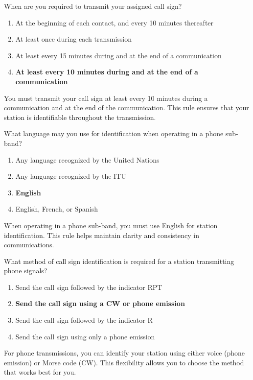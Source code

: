 \begin{tcolorbox}[colback=gray!10!white,colframe=black!75!black,title={T1F03}]
    When are you required to transmit your assigned call sign?
    \begin{enumerate}[label=\Alph*),noitemsep]
        \item At the beginning of each contact, and every 10 minutes thereafter
        \item At least once during each transmission
        \item At least every 15 minutes during and at the end of a communication
        \item \textbf{At least every 10 minutes during and at the end of a communication}
    \end{enumerate}
\end{tcolorbox}
You must transmit your call sign at least every 10 minutes during a communication and at the end of the communication. This rule ensures that your station is identifiable throughout the transmission.

\begin{tcolorbox}[colback=gray!10!white,colframe=black!75!black,title={T1F04}]
    What language may you use for identification when operating in a phone sub-band?
    \begin{enumerate}[label=\Alph*),noitemsep]
        \item Any language recognized by the United Nations
        \item Any language recognized by the ITU
        \item \textbf{English}
        \item English, French, or Spanish
    \end{enumerate}
\end{tcolorbox}
When operating in a phone sub-band, you must use English for station identification. This rule helps maintain clarity and consistency in communications.

\begin{tcolorbox}[colback=gray!10!white,colframe=black!75!black,title={T1F05}]
    What method of call sign identification is required for a station transmitting phone signals?
    \begin{enumerate}[label=\Alph*),noitemsep]
        \item Send the call sign followed by the indicator RPT
        \item \textbf{Send the call sign using a CW or phone emission}
        \item Send the call sign followed by the indicator R
        \item Send the call sign using only a phone emission
    \end{enumerate}
\end{tcolorbox}
For phone transmissions, you can identify your station using either voice (phone emission) or Morse code (CW). This flexibility allows you to choose the method that works best for you.

